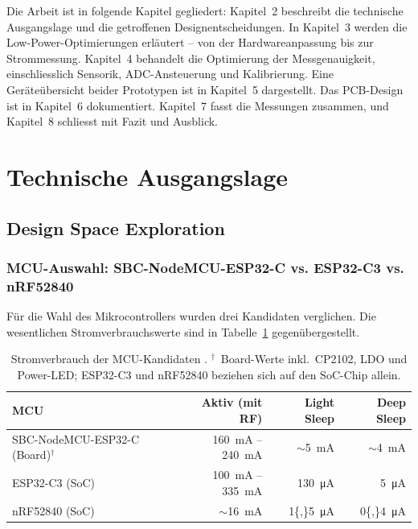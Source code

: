 \documentclass[12pt,a4paper]{article}
\begin{document}
	Die Arbeit ist in folgende Kapitel gegliedert:
	Kapitel~2 beschreibt die technische Ausgangslage und die getroffenen Designentscheidungen.
	In Kapitel~3 werden die Low-Power-Optimierungen erläutert -- von der Hardwareanpassung bis zur Strommessung.
	Kapitel~4 behandelt die Optimierung der Messgenauigkeit, einschliesslich Sensorik, ADC-Ansteuerung und Kalibrierung.
	Eine Geräteübersicht beider Prototypen ist in Kapitel~5 dargestellt.
	Das PCB-Design ist in Kapitel~6 dokumentiert.
	Kapitel~7 fasst die Messungen zusammen, und Kapitel~8 schliesst mit Fazit und Ausblick.


	\section{Technische Ausgangslage}

	\subsection{Design Space Exploration}

	\subsubsection{MCU-Auswahl: SBC-NodeMCU-ESP32-C vs. ESP32-C3 vs. nRF52840}

	Für die Wahl des Mikrocontrollers wurden drei Kandidaten verglichen.
	Die wesentlichen Stromverbrauchswerte sind in Tabelle~\ref{tab:mcu} gegenübergestellt.

	\begin{table}[h]
		\centering
		\begin{tabular}{lrrr}
			\toprule
			\textbf{MCU} & \textbf{Aktiv (mit RF)} & \textbf{Light Sleep} & \textbf{Deep Sleep} \\
			\midrule
			SBC-NodeMCU-ESP32-C (Board)$^\dagger$ & \SI{160}{\milli\ampere} -- \SI{240}{\milli\ampere} & $\sim$\SI{5}{\milli\ampere} & $\sim$\SI{4}{\milli\ampere} \\
			ESP32-C3 (SoC)                        & \SI{100}{\milli\ampere} -- \SI{335}{\milli\ampere} & \SI{130}{\micro\ampere}     & \SI{5}{\micro\ampere}  \\
			nRF52840 (SoC)                        & $\sim$\SI{16}{\milli\ampere}                       & \SI{1{,}5}{\micro\ampere}   & \SI{0{,}4}{\micro\ampere} \\
			\bottomrule
		\end{tabular}
		\caption{Stromverbrauch der MCU-Kandidaten \cite{sbc_nodemcu_esp32c_datasheet, esp32_devboard_sleep, esp32c3_datasheet, nrf52840_datasheet}.
		$^\dagger$~Board-Werte inkl.\ CP2102, LDO und Power-LED; ESP32-C3 und nRF52840 beziehen sich auf den SoC-Chip allein.}
		\label{tab:mcu}
	\end{table}
\end{document}
